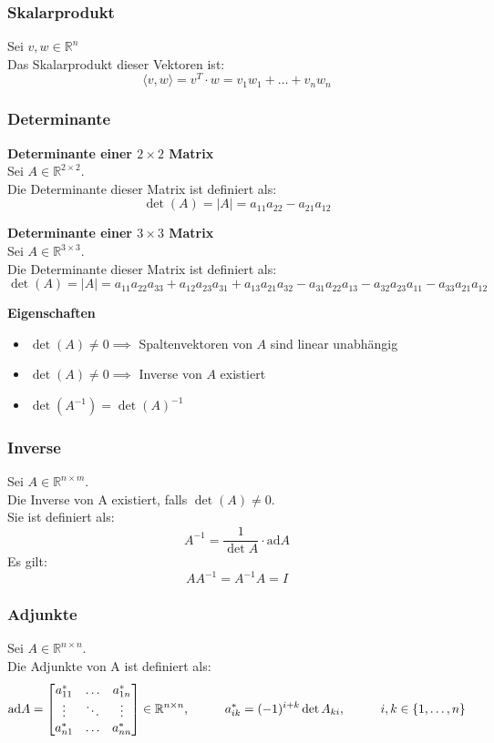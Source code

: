 \documentclass[10pt,a4paper]{article}
\newcommand{\tab}[1][1]{\hspace*{#1cm}}
\begin{document}
\subsubsection{Skalarprodukt}
Sei $v, w \in \mathbb{R}^n$ \\
Das Skalarprodukt dieser Vektoren ist:
$$
\langle v, w \rangle = v^T ⋅ w = v_1w_1 + \dots + v_nw_n
$$

\subsubsection{Determinante}
\textbf{Determinante einer $2 \times 2$ Matrix} \\
Sei $A \in \mathbb{R}^{2 \times 2}$. \\
Die Determinante dieser Matrix ist definiert als:
$$
	\det(A) = |A| = a_{11}a_{22} - a_{21}a_{12}
$$

\textbf{Determinante einer $3 \times 3$ Matrix} \\
Sei $A \in \mathbb{R}^{3 \times 3}$. \\
Die Determinante dieser Matrix ist definiert als:
$$
	\det(A) = |A| = a_{11}a_{22}a_{33} + a_{12}a_{23}a_{31} + a_{13}a_{21}a_{32} - a_{31}a_{22}a_{13} - a_{32}a_{23}a_{11} - a_{33}a_{21}a_{12}
$$

\textbf{Eigenschaften}
\begin{itemize}
	\item $\det(A) ≠ 0 \implies$ Spaltenvektoren von $A$ sind linear unabhängig
	\item $\det(A) ≠ 0 \implies$ Inverse von $A$ existiert
	\item $\det(A^{-1}) = \det(A)^{-1}$
\end{itemize}

\subsubsection{Inverse}
Sei $A \in \mathbb{R}^{n \times m}$. \\
Die Inverse von A existiert, falls $\det(A) ≠ 0$. \\
Sie ist definiert als:
$$
	A^{-1} = \frac{1}{\det A} ⋅ \textrm{ad}A
$$
Es gilt:
$$
	AA^{-1} = A^{-1}A = I
$$

\subsubsection{Adjunkte}
Sei $A \in \mathbb{R}^{n \times n}$. \\
Die Adjunkte von A ist definiert als:
$$
	\textrm{ad} A  = \begin{bmatrix}
	a^*_{11} & \dots & a^*_{1n} \\
	\vdots & \ddots & \vdots \\
	a^*_{n1} & \dots & a^*_{nn}
	\end{bmatrix} \in \mathbb{R}^{n \times n}, \tab a^*_{ik} = (-1)^{i + k} \det A_{ki}, \tab i,k \in \{1, \dots, n\}
$$
\end{document}
